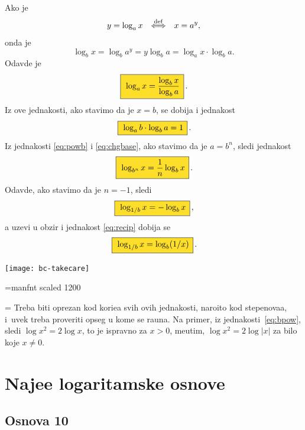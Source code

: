 \documentclass[12pt, twoside, a4paper]{article}
\def\logten{\log_{10}}
\def\loga{\log_a}
\def\logb{\log_b}
\def\okvir#1{\,\fcolorbox{black}{Goldenrod}{$\,\displaystyle{\mathstrut #1}\,$}\,}
\def\podef{{\quad\buildrel\rm def\over\Longleftrightarrow\quad}}
\begin{document}
Ako je
$$
y = \loga x \podef x = a^y,
$$
onda je 
$$
\logb x=\logb a^y=y\logb a=\loga x\cdot\logb a.
$$
Odavde je
\begin{equation}
\okvir{\loga x=\frac{\logb x}{\logb a}}.
\label{eq:chgbase}
\end{equation}
Iz ove jednakosti, ako stavimo da je $x=b$, se dobija i jednakost
\begin{equation}
\okvir{\loga b\cdot\logb a = 1}.
\end{equation}
Iz jednakosti \eqref{eq:powb} i \eqref{eq:chgbase}, ako stavimo da je $a=b^n$, sledi jednakost
\begin{equation}
\okvir{\log_{b^n}x = \frac1n \logb x}.
\label{eq:powbase}
\end{equation}
Odavde, ako stavimo da je $n=-1$, sledi
\begin{equation}
\okvir{\log_{1/b}x = -\logb x},
\end{equation}
a uzev{\sv}i u obzir i jednakost \eqref{eq:recip} dobija se
\begin{equation}
\okvir{\log_{1/b}x = \logb(1/x)}.
\end{equation}

\bigskip

\newcommand\takecare{\texttt{[image: bc-takecare]}}%
\robustify\takecare

\font\manfnt=manfnt scaled 1200 %
\def\dbend{{\manfnt\char126\relax}}
\def\danger{\hangindent=\parindent 
\hangafter=-2 \noindent\leavevmode
\smash{\hbox to 0pt{\kern-\hangindent\lower1.2pt\hbox{\dbend}\hss}}%
}


\danger\label{danger}%
Treba biti oprezan kod kori{\sv}{\cc}e{\nj}a svih ovih jednakosti, naro{\cv}ito kod ste\-pe\-no\-va{\nj}a, 
i~uvek treba proveriti opseg u kome se ra{\cv}una.
Na primer, iz jed\-na\-ko\-sti~\eqref{eq:bpow}, sledi $\log x^2=2\log x$, {\sv}to je ispravno za $x>0$,
me{\dj}utim, $\log x^2=2\log|x|$ za bilo koje $x\ne0$. 

\section{Naj{\cv}e{\sv}{\cc}e logaritamske osnove}

\subsection{Osnova 10}\index{log10@$\logten$}
\end{document}
